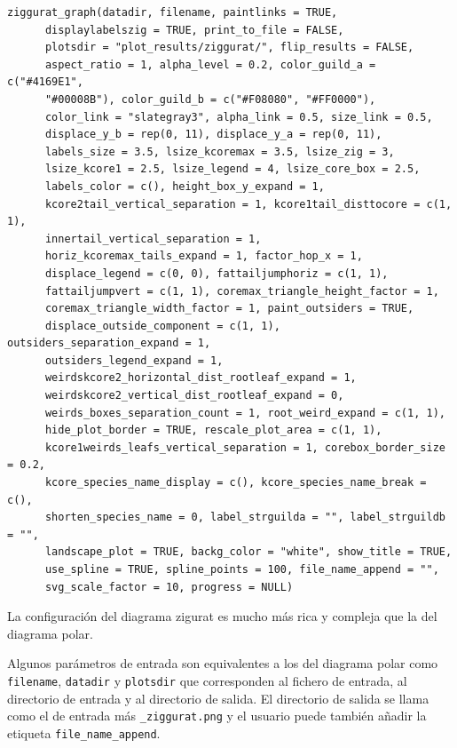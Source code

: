 \fontsize{3.5mm}{3.5mm}\selectfont
\begin{verbatim}
ziggurat_graph(datadir, filename, paintlinks = TRUE,
	  displaylabelszig = TRUE, print_to_file = FALSE,
	  plotsdir = "plot_results/ziggurat/", flip_results = FALSE,
	  aspect_ratio = 1, alpha_level = 0.2, color_guild_a = c("#4169E1",
	  "#00008B"), color_guild_b = c("#F08080", "#FF0000"),
	  color_link = "slategray3", alpha_link = 0.5, size_link = 0.5,
	  displace_y_b = rep(0, 11), displace_y_a = rep(0, 11), 
	  labels_size = 3.5, lsize_kcoremax = 3.5, lsize_zig = 3, 
	  lsize_kcore1 = 2.5, lsize_legend = 4, lsize_core_box = 2.5, 
	  labels_color = c(), height_box_y_expand = 1, 
	  kcore2tail_vertical_separation = 1, kcore1tail_disttocore = c(1, 1), 
	  innertail_vertical_separation = 1,
	  horiz_kcoremax_tails_expand = 1, factor_hop_x = 1,
	  displace_legend = c(0, 0), fattailjumphoriz = c(1, 1),
	  fattailjumpvert = c(1, 1), coremax_triangle_height_factor = 1,
	  coremax_triangle_width_factor = 1, paint_outsiders = TRUE,
	  displace_outside_component = c(1, 1), outsiders_separation_expand = 1,
	  outsiders_legend_expand = 1,
	  weirdskcore2_horizontal_dist_rootleaf_expand = 1,
	  weirdskcore2_vertical_dist_rootleaf_expand = 0,
	  weirds_boxes_separation_count = 1, root_weird_expand = c(1, 1),
	  hide_plot_border = TRUE, rescale_plot_area = c(1, 1),
	  kcore1weirds_leafs_vertical_separation = 1, corebox_border_size = 0.2,
	  kcore_species_name_display = c(), kcore_species_name_break = c(),
	  shorten_species_name = 0, label_strguilda = "", label_strguildb = "",
	  landscape_plot = TRUE, backg_color = "white", show_title = TRUE,
	  use_spline = TRUE, spline_points = 100, file_name_append = "",
	  svg_scale_factor = 10, progress = NULL)
\end{verbatim}
\normalsize

La configuración del diagrama zigurat es mucho más rica y compleja que la del diagrama polar. 
%

Algunos parámetros de entrada son equivalentes a los del  diagrama polar como \texttt{filename}, \texttt{datadir} y \texttt{plotsdir} que 
corresponden al fichero de entrada, al directorio de entrada y al directorio de salida. El directorio de salida se llama
como el de entrada más \texttt{\_ziggurat.png} y el usuario puede también añadir la etiqueta \texttt{file\_name\_append}.

